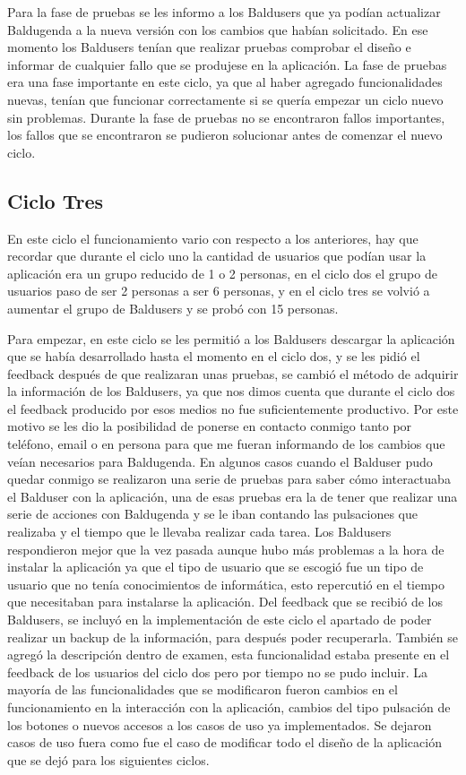 Para la fase de pruebas se les informo a los Baldusers que ya podían actualizar Baldugenda a la nueva versión con los cambios que habían solicitado. En ese momento los Baldusers tenían que realizar pruebas comprobar el diseño e informar de  cualquier fallo que se produjese en la aplicación. La fase de pruebas era una fase importante en este ciclo, ya que al haber agregado funcionalidades nuevas, tenían que funcionar correctamente si se quería empezar un ciclo nuevo sin problemas. Durante la fase de pruebas no se encontraron fallos importantes, los fallos que se encontraron se pudieron solucionar antes de comenzar el nuevo ciclo.

\subsection{Ciclo Tres}
\label{subsecc:ciclo Tres}

En este ciclo el funcionamiento vario con respecto a los anteriores, hay que recordar que durante el ciclo uno la cantidad de usuarios que podían usar la aplicación era un grupo reducido de 1 o 2 personas, en el ciclo dos el grupo de usuarios paso de ser 2 personas a ser 6 personas, y en el ciclo tres se volvió a aumentar el grupo de Baldusers y se probó con 15 personas.

Para empezar, en este ciclo se les permitió a los Baldusers descargar la aplicación que se había desarrollado hasta el momento en el ciclo dos, y se les pidió el feedback después de que realizaran unas pruebas, se cambió el método de adquirir la información de los Baldusers, ya que nos dimos cuenta que durante el ciclo dos el feedback producido por esos medios no fue suficientemente productivo. Por este motivo se les dio la posibilidad de ponerse en contacto conmigo tanto por teléfono, email o en persona para que me fueran informando de los cambios que veían necesarios para Baldugenda.
En algunos casos cuando el Balduser pudo quedar conmigo se realizaron una serie de pruebas para saber cómo interactuaba el Balduser con la aplicación, una de esas pruebas era la de tener que realizar una serie de acciones con Baldugenda y se le iban contando las pulsaciones que realizaba y el tiempo que le llevaba realizar cada tarea.
Los Baldusers respondieron mejor que la vez pasada aunque hubo más problemas a la hora de instalar la aplicación ya que el tipo de usuario que se escogió fue un tipo de usuario que no tenía conocimientos de informática, esto repercutió en el tiempo que necesitaban para instalarse la aplicación. Del feedback que se recibió de los Baldusers, se incluyó en la implementación de este ciclo el apartado de poder realizar un backup de la información, para después poder recuperarla. También se agregó la descripción dentro de examen, esta funcionalidad estaba presente en el feedback de los usuarios del ciclo dos pero por tiempo no se pudo incluir. La mayoría de las funcionalidades que se modificaron fueron cambios en el funcionamiento en la interacción con la aplicación, cambios del tipo pulsación de los botones o nuevos accesos a los casos de uso ya implementados. Se dejaron casos de uso fuera como fue el caso de modificar todo el diseño de la aplicación que se dejó para los siguientes ciclos.

